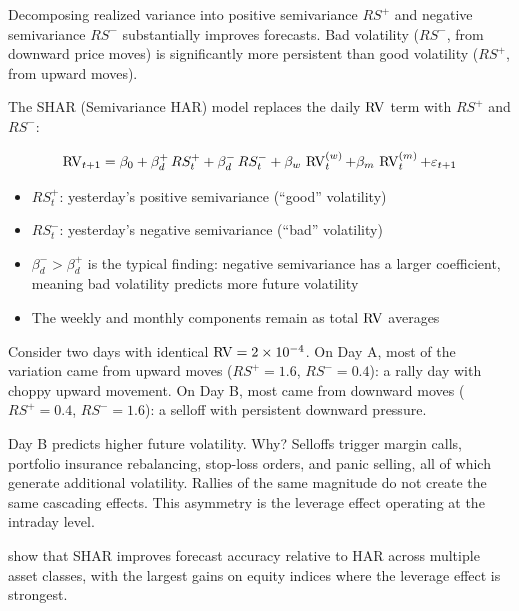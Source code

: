 \begin{keyresult}
Decomposing realized variance into positive semivariance $RS^+$ and negative semivariance $RS^-$ substantially improves forecasts.
Bad volatility ($RS^-$, from downward price moves) is significantly more persistent than good volatility ($RS^+$, from upward moves).
\end{keyresult}

The SHAR (Semivariance HAR) model replaces the daily $\operatorname{RV}$ term with $RS^+$ and $RS^-$:

\begin{equation}
  \operatorname{RV}_{t+1} = \beta_0 + \beta^+_d \, RS^+_t + \beta^-_d \, RS^-_t
             + \beta_w \, \operatorname{RV}^{(w)}_t + \beta_m \, \operatorname{RV}^{(m)}_t + \varepsilon_{t+1}
  \label{eq:shar}
\end{equation}
\begin{itemize}[nosep]
  \item $RS^+_t$: yesterday's positive semivariance (``good'' volatility)
  \item $RS^-_t$: yesterday's negative semivariance (``bad'' volatility)
  \item $\beta^-_d > \beta^+_d$ is the typical finding: negative semivariance has a larger coefficient, meaning bad volatility predicts more future volatility
  \item The weekly and monthly components remain as total $\operatorname{RV}$ averages
\end{itemize}

\begin{intuition}
Consider two days with identical $\operatorname{RV} = 2 \times 10^{-4}$.
On Day A, most of the variation came from upward moves ($RS^+ = 1.6$, $RS^- = 0.4$): a rally day with choppy upward movement.
On Day B, most came from downward moves ($RS^+ = 0.4$, $RS^- = 1.6$): a selloff with persistent downward pressure.

Day B predicts higher future volatility.
Why?
Selloffs trigger margin calls, portfolio insurance rebalancing, stop-loss orders, and panic selling, all of which generate additional volatility.
Rallies of the same magnitude do not create the same cascading effects.
This asymmetry is the leverage effect operating at the intraday level.
\end{intuition}

\citet{PSS2015} show that SHAR improves forecast accuracy relative to HAR across multiple asset classes, with the largest gains on equity indices where the leverage effect is strongest.


